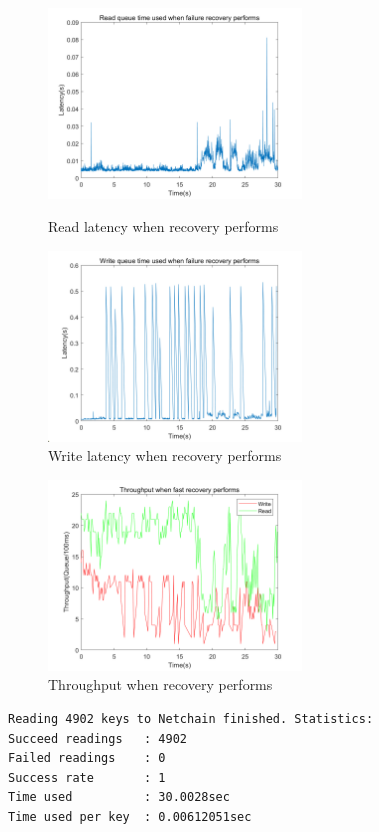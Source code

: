\documentclass[11pt,oneside,a4paper]{article}
\begin{document}
\begin{enumerate}
\begin{figure}[htbp]
    \centering
    \begin{minipage}[t]{0.48\textwidth}
    \centering
    \includegraphics[width=0.6\textwidth]{figures/Recovery_read_latency.png}
    \caption{Read latency when recovery performs}
    \label{fig:my_label}
    \end{minipage}
    \begin{minipage}[t]{0.48\textwidth}
    \centering
    \includegraphics[width=0.6\textwidth]{figures/Recovery_write_latency.png}
    \caption{Write latency when recovery performs}
    \label{fig:my_label}
    \end{minipage}
    
\end{figure}

\begin{figure}
    \centering
    \includegraphics[width=0.6\textwidth]{figures/Recovery_thrp.png}
    \caption{Throughput when recovery performs}
    \label{fig:my_label}
\end{figure}
\begin{lstlisting}
Reading 4902 keys to Netchain finished. Statistics:
Succeed readings   : 4902
Failed readings    : 0
Success rate       : 1
Time used          : 30.0028sec
Time used per key  : 0.00612051sec


\end{lstlisting}
\end{enumerate}
\end{document}
